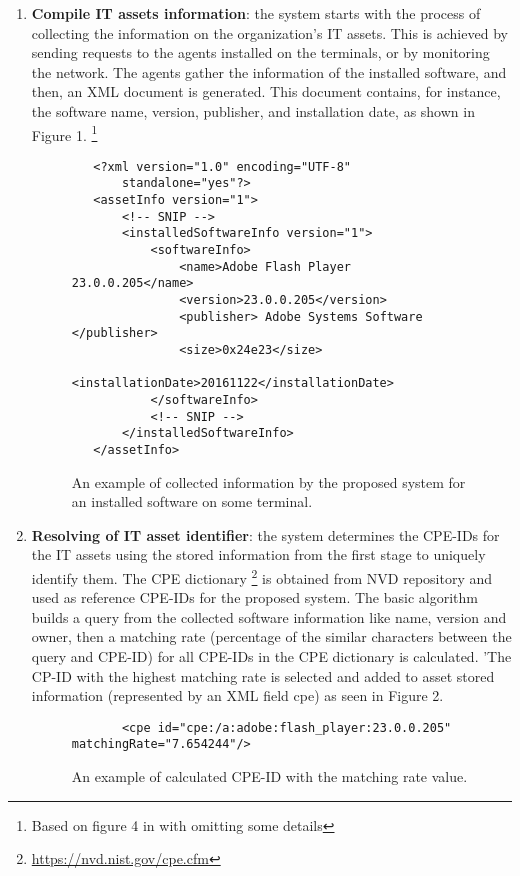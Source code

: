 \documentclass{llncs}
\begin{document}
\begin{enumerate}
 \item \textbf{Compile IT assets information}: the system starts with the process of collecting the information on the organization's IT assets. This is achieved by sending requests to the agents installed on the terminals, or by monitoring the network. The agents gather the information of the installed software, and then, an XML document is generated. This document contains, for instance, the software name, version, publisher, and installation date, as shown in Figure 1.  \footnote{Based on figure 4 in \cite{paper1} with omitting some details} 

 \begin{figure}
 \centering
   \lstset{language=XML}
    \begin{lstlisting}
   <?xml version="1.0" encoding="UTF-8"
       standalone="yes"?>
   <assetInfo version="1">
       <!-- SNIP -->
       <installedSoftwareInfo version="1">
           <softwareInfo>
               <name>Adobe Flash Player 23.0.0.205</name>
               <version>23.0.0.205</version>
               <publisher> Adobe Systems Software </publisher>
               <size>0x24e23</size>
               <installationDate>20161122</installationDate>
           </softwareInfo>
           <!-- SNIP -->
       </installedSoftwareInfo>
   </assetInfo>
    \end{lstlisting}
   \caption{An example of collected information by the proposed system for an installed software on some terminal.}
    \end{figure}
   
   
   \item \textbf{Resolving of IT asset identifier}: the system determines the CPE-IDs for the IT assets using the stored information from the first stage to uniquely identify them. The CPE dictionary \footnote{\url{https://nvd.nist.gov/cpe.cfm}} is obtained from NVD repository and used as reference CPE-IDs for the proposed system. The basic algorithm builds a query from the collected software information like name, version and owner, then a matching rate (percentage of the similar characters between the query and CPE-ID) for all CPE-IDs in the CPE dictionary is calculated. '\newpage The CP-ID with the highest matching rate is selected and added to asset stored information (represented by an XML field cpe) as seen in Figure 2.
   
    \begin{figure}
    \centering
      \lstset{language=XML}
       \begin{lstlisting} 
       <cpe id="cpe:/a:adobe:flash_player:23.0.0.205" matchingRate="7.654244"/>
       \end{lstlisting}
      \caption{An example of calculated CPE-ID with the matching rate value.}
       \end{figure}
      

\end{enumerate}
\end{document}

